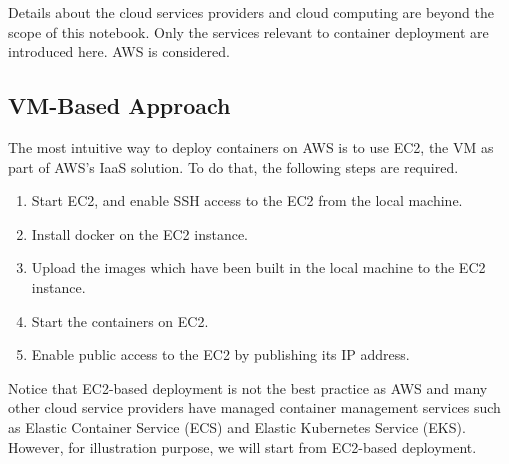 Details about the cloud services providers and cloud computing are beyond the scope of this notebook. Only the services relevant to container deployment are introduced here. AWS is considered.

\subsection{VM-Based Approach}

The most intuitive way to deploy containers on AWS is to use EC2, the VM as part of AWS's IaaS solution. To do that, the following steps are required.

\begin{enumerate}
	\item Start EC2, and enable SSH access to the EC2 from the local machine.
	\item Install docker on the EC2 instance.
	\item Upload the images which have been built in the local machine to the EC2 instance.
	\item Start the containers on EC2.
	\item Enable public access to the EC2 by publishing its IP address.
\end{enumerate}

Notice that EC2-based deployment is not the best practice as AWS and many other cloud service providers have managed container management services such as Elastic Container Service (ECS) and Elastic Kubernetes Service (EKS). However, for illustration purpose, we will start from EC2-based deployment.

